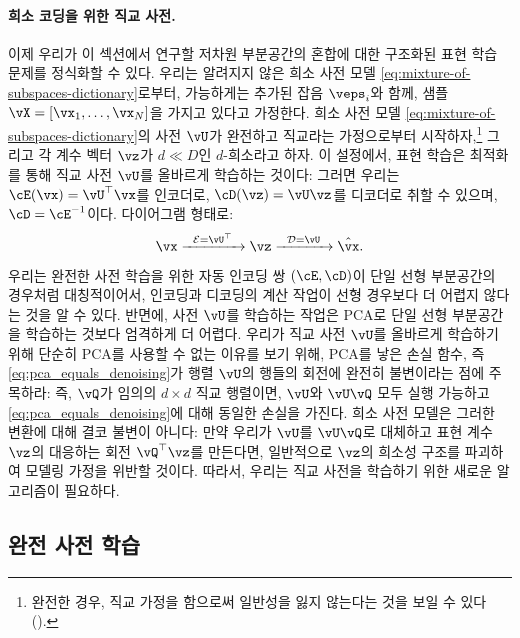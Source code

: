 \documentclass[../../book-main_ko.tex]{subfiles}
\begin{document}
\paragraph{희소 코딩을 위한 직교 사전.}
이제 우리가 이 섹션에서 연구할 저차원 부분공간의 혼합에 대한 구조화된 표현 학습 문제를 정식화할 수 있다.
우리는 알려지지 않은 희소 사전 모델 \eqref{eq:mixture-of-subspaces-dictionary}로부터, 가능하게는 추가된 잡음 \(\veps_i\)와 함께, 샘플 \(\vX = [\vx_1, \dots, \vx_N]\)을 가지고 있다고 가정한다.
희소 사전 모델 \eqref{eq:mixture-of-subspaces-dictionary}의 사전 \(\vU\)가 완전하고 직교라는 가정으로부터 시작하자,\footnote{완전한 경우, 직교 가정을 함으로써 일반성을 잃지 않는다는 것을 보일 수 있다 ().} 그리고 각 계수 벡터 \(\vz\)가 \(d \ll D\)인 \(d\)-희소라고 하자.
이 설정에서, 표현 학습은 최적화를 통해 직교 사전 \(\vU\)를 올바르게 학습하는 것이다: 그러면 우리는 \(\cE(\vx) = \vU^\top \vx\)를 인코더로, \(\cD(\vz) = \vU \vz\)를 디코더로 취할 수 있으며, \(\cD = \cE^{-1}\)이다. 다이어그램 형태로:
\begin{equation}
\vx \xrightarrow{\hspace{2mm} \mathcal{E} = \vU^\top \hspace{2mm}}  \vz \xrightarrow{\hspace{2mm} \mathcal{D} = \vU \hspace{2mm}}   \hat{\vx}.
\label{eqn:autoencoding-DL}
\end{equation}
우리는 완전한 사전 학습을 위한 자동 인코딩 쌍 \((\cE, \cD)\)이 단일 선형 부분공간의 경우처럼 대칭적이어서, 인코딩과 디코딩의 계산 작업이 선형 경우보다 더 어렵지 않다는 것을 알 수 있다. 반면에, 사전 \(\vU\)를 학습하는 작업은 PCA로 단일 선형 부분공간을 학습하는 것보다 엄격하게 더 어렵다.
우리가 직교 사전 \(\vU\)를 올바르게 학습하기 위해 단순히 PCA를 사용할 수 없는 이유를 보기 위해, PCA를 낳은 손실 함수, 즉 \eqref{eq:pca_equals_denoising}가 행렬 \(\vU\)의 행들의 회전에 완전히 불변이라는 점에 주목하라: 즉, \(\vQ\)가 임의의 \(d \times d\) 직교 행렬이면, \(\vU\)와 \(\vU \vQ\) 모두 실행 가능하고 \eqref{eq:pca_equals_denoising}에 대해 동일한 손실을 가진다. 희소 사전 모델은 그러한 변환에 대해 결코 불변이 아니다: 만약 우리가 \(\vU\)를 \(\vU \vQ\)로 대체하고 표현 계수 \(\vz\)의 대응하는 회전 \(\vQ^\top \vz\)를 만든다면, 일반적으로 \(\vz\)의 희소성 구조를 파괴하여 모델링 가정을 위반할 것이다. 따라서, 우리는 직교 사전을 학습하기 위한 새로운 알고리즘이 필요하다.

\subsection{완전 사전 학습}
\label{sec:complete-dictionary}
\end{document}
